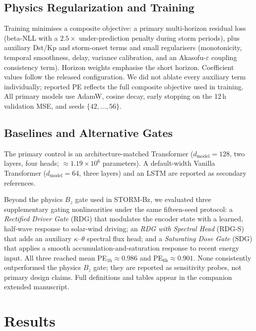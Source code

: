 \documentclass[conference]{IEEEtran}
\begin{document}
\subsection{Physics Regularization and Training}
Training minimises a composite objective: a primary multi-horizon residual loss (beta-NLL with a \(2.5\times\) under-prediction penalty during storm periods), plus auxiliary Dst/Kp and storm-onset terms and small regularisers (monotonicity, temporal smoothness, delay, variance calibration, and an Akasofu-\(\varepsilon\) coupling consistency term). Horizon weights emphasise the short horizon. Coefficient values follow the released configuration. We did not ablate every auxiliary term individually; reported PE reflects the full composite objective used in training. All primary models use AdamW, cosine decay, early stopping on the 12\,h validation MSE, and seeds \(\{42,\ldots,56\}\).

\subsection{Baselines and Alternative Gates}
The primary control is an architecture-matched Transformer
($d_{\mathrm{model}}=128$, two layers, four heads;
$\approx1.19\times10^{6}$ parameters). A default-width Vanilla Transformer
($d_{\mathrm{model}}=64$, three layers) and an LSTM are reported as
secondary references.

Beyond the physics $B_z$ gate used in STORM-Bz, we evaluated three
supplementary gating nonlinearities under the same fifteen-seed protocol:
a \emph{Rectified Driver Gate} (RDG) that modulates the encoder state with a
learned, half-wave response to solar-wind driving; an \emph{RDG with Spectral
Head} (RDG-S) that adds an auxiliary $\kappa$--$\theta$ spectral flux head;
and a \emph{Saturating Dose Gate} (SDG) that applies a smooth
accumulation-and-saturation response to recent energy input. All three reached
mean PE$_{1\mathrm{h}}\approx0.986$ and PE$_{6\mathrm{h}}\approx0.901$.
None consistently outperformed the physics $B_z$ gate; they are reported as
sensitivity probes, not primary design claims. Full definitions and tables
appear in the companion extended manuscript.

\section{Results}
\label{sec:results}
\end{document}
